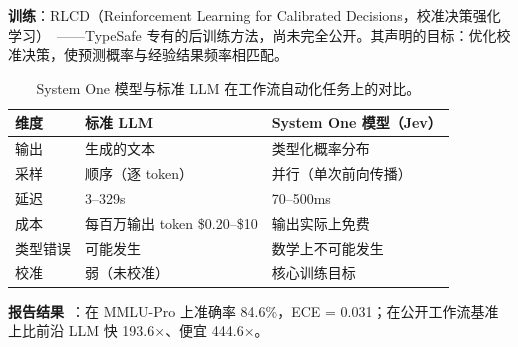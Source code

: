\textbf{训练}：RLCD（Reinforcement Learning for Calibrated Decisions，校准决策强化学习）~\cite{almeida2026jev}——TypeSafe 专有的后训练方法，尚未完全公开。其声明的目标：优化校准决策，使预测概率与经验结果频率相匹配。

\begin{table}[ht!]
\centering
\caption{System One 模型与标准 LLM 在工作流自动化任务上的对比。}
{\small
\begin{tabular}{@{}lll@{}}
\toprule
\textbf{维度} & \textbf{标准 LLM} & \textbf{System One 模型（Jev）} \\
\midrule
输出 & 生成的文本 & 类型化概率分布 \\
采样 & 顺序（逐 token） & 并行（单次前向传播） \\
延迟 & 3--329s & 70--500ms \\
成本 & 每百万输出 token \$0.20--\$10 & 输出实际上免费 \\
类型错误 & 可能发生 & 数学上不可能发生 \\
校准 & 弱（未校准） & 核心训练目标 \\
\bottomrule
\end{tabular}
}
\end{table}

\textbf{报告结果}~\cite{almeida2026jev}：在 MMLU-Pro 上准确率 84.6\%，ECE = 0.031；在公开工作流基准上比前沿 LLM 快 193.6$\times$、便宜 444.6$\times$。

